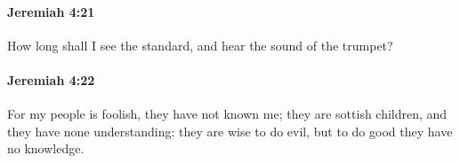 		\paragraph{Jeremiah 4:21} %
			\label{JEREMIAH-4-21}

			How long shall I see the standard, and hear the sound of the trumpet?


		\paragraph{Jeremiah 4:22} %
			\label{JEREMIAH-4-22}

			For my people is foolish, they have not known me; they are sottish children, and they have none understanding: they are wise to do evil, but to do good they have no knowledge.


